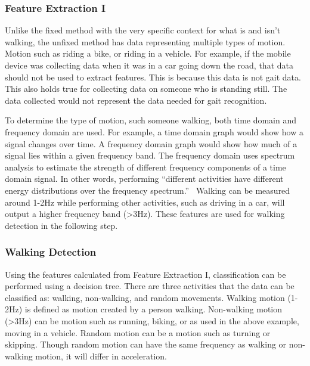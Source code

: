 \documentclass{sig-alternate}
\begin{document}
\subsubsection{Feature Extraction I}
	 Unlike the fixed method with the very specific context for what is and isn't walking, the unfixed method has data representing multiple types of motion. Motion such as riding a bike, or riding in a vehicle. For example, if the mobile device was collecting data when it was in a car going down the road, that data should not be used to extract features. This is because this data is not gait data. This also holds true for collecting data on someone who is standing still. The data collected would not represent the data needed for gait recognition.
	 
 	
	To determine the type of motion, such someone walking, both time domain and frequency domain are used. For example, a time domain graph would show how a signal changes over time. A frequency domain graph would show how much of a signal lies within a given frequency band. The frequency domain uses spectrum analysis to estimate the strength of different frequency components of a time domain signal. In other words, performing ``different activities have different energy distributions over the frequency spectrum.''~\cite{Lu:2014} Walking can be measured around 1-2Hz while performing other activities, such as driving in a car, will output a higher frequency band (>3Hz). These features are used for walking detection in the following step.
			
\subsubsection{Walking Detection} \label{WD}
	Using the features calculated from Feature Extraction I, classification can be performed using a decision tree. There are three activities that the data can be classified as: walking, non-walking, and random movements. Walking motion (1-2Hz) is defined as motion created by a person walking. Non-walking motion (>3Hz) can be motion such as running, biking, or as used in the above example, moving in a vehicle. Random motion can be a motion such as turning or skipping. Though random motion can have the same frequency as walking or non-walking motion, it will differ in acceleration.  
			
\end{document}

